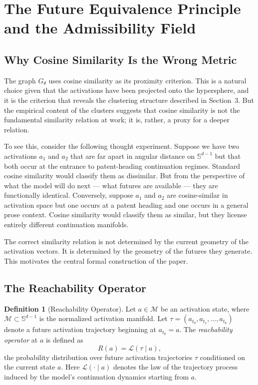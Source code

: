 \documentclass[12pt, a4paper]{article}
\theoremstyle{plain}
\theoremstyle{definition}
\newtheorem{definition}[theorem]{Definition}
\theoremstyle{remark}
\newcommand{\Sph}{\mathbb{S}}
\newcommand{\cM}{\mathcal{M}}
\newcommand{\cL}{\mathcal{L}}
\newcommand{\reachset}[1]{R(#1)}
\begin{document}
\section{The Future Equivalence Principle and the Admissibility Field}

\subsection{Why Cosine Similarity Is the Wrong Metric}

The graph $G_\theta$ uses cosine similarity as its proximity criterion.
This is a natural choice given that the activations have been projected onto
the hypersphere, and it is the criterion that reveals the clustering structure
described in Section~3. But the empirical content of the clusters suggests that
cosine similarity is not the fundamental similarity relation at work; it is,
rather, a proxy for a deeper relation.

To see this, consider the following thought experiment. Suppose we have two
activations $a_1$ and $a_2$ that are far apart in angular distance on
$\Sph^{d-1}$ but that both occur at the entrance to patent-heading continuation
regimes. Standard cosine similarity would classify them as dissimilar. But from
the perspective of what the model will do next --- what futures are available ---
they are functionally identical. Conversely, suppose $a_1$ and $a_2$ are
cosine-similar in activation space but one occurs at a patent heading and one
occurs in a general prose context. Cosine similarity would classify them as
similar, but they license entirely different continuation manifolds.

The correct similarity relation is not determined by the current geometry of
the activation vectors. It is determined by the geometry of the futures they
generate. This motivates the central formal construction of the paper.

\subsection{The Reachability Operator}

\begin{definition}[Reachability Operator]
  Let $a \in \cM$ be an activation state, where $\cM \subset \Sph^{d-1}$ is the
  normalized activation manifold. Let $\tau = (a_{t_0}, a_{t_1}, \ldots,
  a_{t_k})$ denote a future activation trajectory beginning at $a_{t_0} = a$.
  The \emph{reachability operator} at $a$ is defined as
  \begin{equation}
    \reachset{a} = \cL(\tau \mid a),
  \end{equation}
  the probability distribution over future activation trajectories $\tau$
  conditioned on the current state $a$. Here $\cL(\cdot \mid a)$ denotes the
  law of the trajectory process induced by the model's continuation dynamics
  starting from $a$.
\end{definition}
\end{document}
